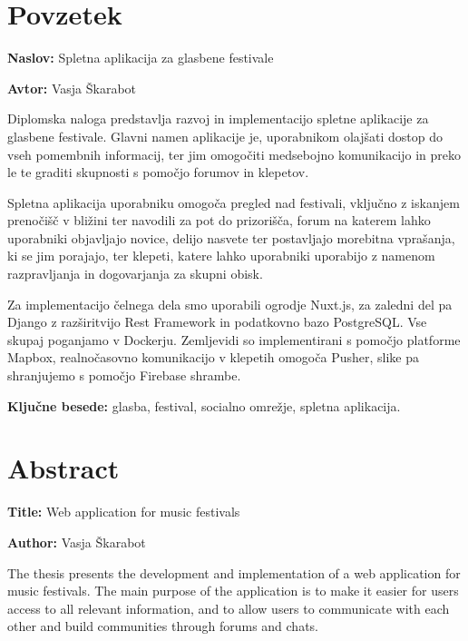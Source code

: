 \documentclass[a4paper,12pt,openright]{book}
\newcommand{\ttitle}{Spletna aplikacija za glasbene festivale}
\newcommand{\ttitleEn}{Web application for music festivals}
\newcommand{\tauthor}{Vasja Škarabot}
\newcommand{\tkeywords}{glasba, festival, socialno omrežje, spletna aplikacija}
\newcommand{\clearemptydoublepage}{\newpage{\pagestyle{empty}\cleardoublepage}}
\begin{document}
\clearemptydoublepage

{}
\chapter*{Povzetek}

\noindent\textbf{Naslov:} \ttitle
\bigskip

\noindent\textbf{Avtor:} \tauthor
\bigskip

\noindent 
Diplomska naloga predstavlja razvoj in implementacijo spletne aplikacije za glasbene festivale. Glavni namen aplikacije je, uporabnikom olajšati
dostop do vseh pomembnih informacij, ter jim omogočiti medsebojno komunikacijo in preko le te graditi skupnosti s pomočjo forumov in klepetov. 

Spletna aplikacija uporabniku omogoča pregled nad festivali, vključno z iskanjem prenočišč v bližini ter navodili za pot do prizorišča, forum na katerem lahko uporabniki
objavljajo novice, delijo nasvete ter postavljajo morebitna vprašanja, ki se jim porajajo, ter klepeti, katere lahko uporabniki uporabijo z namenom razpravljanja in dogovarjanja za skupni obisk. 

Za implementacijo čelnega dela smo uporabili ogrodje Nuxt.js, za zaledni del pa Django z razširitvijo Rest Framework in podatkovno bazo PostgreSQL. Vse skupaj poganjamo v Dockerju.
Zemljevidi so implementirani s pomočjo platforme Mapbox, realnočasovno komunikacijo v klepetih omogoča Pusher, slike pa shranjujemo s pomočjo Firebase shrambe.

\bigskip

\noindent\textbf{Ključne besede:} \tkeywords.
\clearemptydoublepage

{}
\chapter*{Abstract}

\noindent\textbf{Title:} \ttitleEn
\bigskip

\noindent\textbf{Author:} \tauthor
\bigskip

\noindent 
The thesis presents the development and implementation of a web application for music festivals. The main purpose of the application is to make it easier for users
access to all relevant information, and to allow users to communicate with each other and build communities through forums and chats. 
\end{document}

